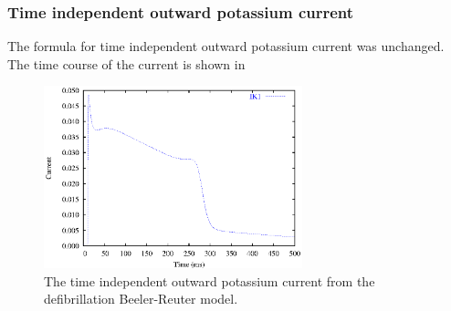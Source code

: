 \subsubsection{Time independent outward potassium current}
The formula for time independent outward potassium current was unchanged. The
time course of the current is shown in 
\begin{figure}[hbtp] 
  \centering
  \includegraphics[width=75mm]{cardiac_electrophysiology/epsfiles/BRDR_IK1.eps}
  \caption[Defibrillation Beeler-Reuter time independent potassium current]{The time
    independent outward potassium current from the defibrillation Beeler-Reuter model.}
  \label{fig:BRDR_ik1}
\end{figure}
%
